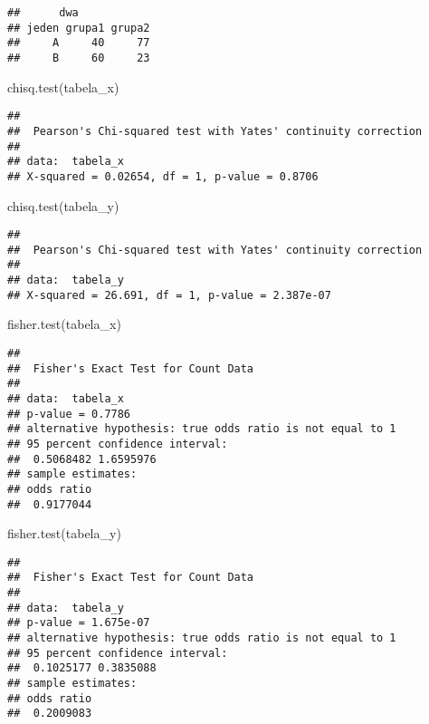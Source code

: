 \documentclass[
]{book}
\newenvironment{Shaded}{\begin{snugshade}}{\end{snugshade}}
\newcommand{\FunctionTok}[1]{\textcolor[rgb]{0.00,0.00,0.00}{#1}}
\newcommand{\NormalTok}[1]{#1}
\begin{document}
\begin{verbatim}
##      dwa
## jeden grupa1 grupa2
##     A     40     77
##     B     60     23
\end{verbatim}

\begin{Shaded}
\begin{Highlighting}[]
\FunctionTok{chisq.test}\NormalTok{(tabela\_x)}
\end{Highlighting}
\end{Shaded}

\begin{verbatim}
## 
##  Pearson's Chi-squared test with Yates' continuity correction
## 
## data:  tabela_x
## X-squared = 0.02654, df = 1, p-value = 0.8706
\end{verbatim}

\begin{Shaded}
\begin{Highlighting}[]
\FunctionTok{chisq.test}\NormalTok{(tabela\_y)}
\end{Highlighting}
\end{Shaded}

\begin{verbatim}
## 
##  Pearson's Chi-squared test with Yates' continuity correction
## 
## data:  tabela_y
## X-squared = 26.691, df = 1, p-value = 2.387e-07
\end{verbatim}

\begin{Shaded}
\begin{Highlighting}[]
\FunctionTok{fisher.test}\NormalTok{(tabela\_x)}
\end{Highlighting}
\end{Shaded}

\begin{verbatim}
## 
##  Fisher's Exact Test for Count Data
## 
## data:  tabela_x
## p-value = 0.7786
## alternative hypothesis: true odds ratio is not equal to 1
## 95 percent confidence interval:
##  0.5068482 1.6595976
## sample estimates:
## odds ratio 
##  0.9177044
\end{verbatim}

\begin{Shaded}
\begin{Highlighting}[]
\FunctionTok{fisher.test}\NormalTok{(tabela\_y)}
\end{Highlighting}
\end{Shaded}

\begin{verbatim}
## 
##  Fisher's Exact Test for Count Data
## 
## data:  tabela_y
## p-value = 1.675e-07
## alternative hypothesis: true odds ratio is not equal to 1
## 95 percent confidence interval:
##  0.1025177 0.3835088
## sample estimates:
## odds ratio 
##  0.2009083
\end{verbatim}
\end{document}
